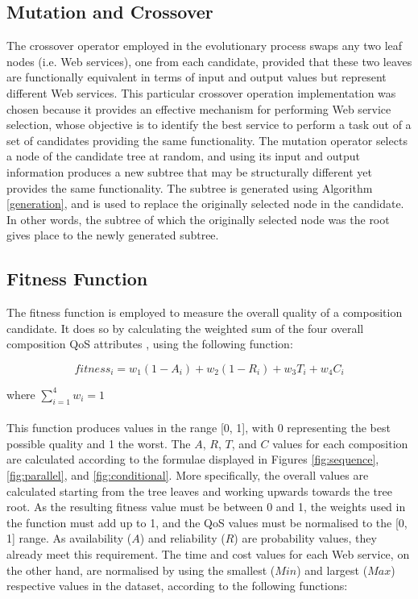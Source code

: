 \documentclass[conference]{IEEEtran}
\begin{document}
\subsection{Mutation and Crossover}\label{mutation}

The crossover operator employed in the evolutionary process swaps any two leaf nodes (i.e. Web services), one from each candidate, provided that these two leaves are functionally equivalent in terms of input and output values but represent different Web services. This particular crossover operation implementation was chosen because it provides an effective mechanism for performing Web service selection, whose objective is to identify the best service to perform a task out of a set of candidates providing the same functionality.
The mutation operator selects a node of the candidate tree at random, and using its input and output information produces a new subtree that may be structurally different yet provides the same functionality. The subtree is generated using Algorithm \ref{generation}, and is used to  replace the originally selected node in the candidate. In other words, the subtree of which the originally selected node was the root gives place to the newly generated subtree.


\subsection{Fitness Function}\label{fitness}

The fitness function is employed to measure the overall quality of a composition candidate. It does so by calculating the weighted sum of the four overall composition QoS attributes \cite{silva2014graph}, using the following function:

\begin{equation}
fitness_i = w_1(1 - A_i) + w_2(1 - R_i) + w_3T_i + w_4C_i
\end{equation}

\noindent where $\sum_{i=1}^{4} w_i = 1$
\\\\

This function produces values in the range [0, 1], with 0 representing the best possible quality and 1 the worst. The $A$, $R$, $T$, and $C$ values for each composition are calculated according to the formulae displayed in Figures \ref{fig:sequence}, \ref{fig:parallel}, and \ref{fig:conditional}. More specifically, the overall values are calculated starting from the tree leaves and working upwards towards the tree root. As the resulting fitness value must be between 0 and 1, the weights used in the function must add up to 1, and the QoS values must be normalised to the [0, 1] range. As availability ($A$) and reliability ($R$) are probability values, they already meet this requirement. The time and cost values for each Web service, on the other hand, are normalised by using the smallest ($Min$) and largest ($Max$) respective values in the dataset, according to the following functions:
\end{document}
